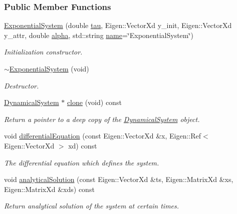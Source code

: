 \subsubsection*{Public Member Functions}
\begin{DoxyCompactItemize}
\item 
\hyperlink{classDmpBbo_1_1ExponentialSystem_a8d0556627bb524b03accc5e60dfc7e1a}{Exponential\+System} (double \hyperlink{group__DynamicalSystems_ga50eec7ad4c9664b5809ace45b22200d5}{tau}, Eigen\+::\+Vector\+Xd y\+\_\+init, Eigen\+::\+Vector\+Xd y\+\_\+attr, double \hyperlink{classDmpBbo_1_1ExponentialSystem_aee36d92680cc62cfd30ad121aa8bb47e}{alpha}, std\+::string \hyperlink{group__DynamicalSystems_gacd23346c798f78014a4f82c853e83c88}{name}=\char`\"{}Exponential\+System\char`\"{})
\begin{DoxyCompactList}\small\item\em Initialization constructor. \end{DoxyCompactList}\item 
\hyperlink{classDmpBbo_1_1ExponentialSystem_ae3aeffaf5234dfecbc5286a37bc82664}{$\sim$\+Exponential\+System} (void)
\begin{DoxyCompactList}\small\item\em Destructor. \end{DoxyCompactList}\item 
\hyperlink{classDmpBbo_1_1DynamicalSystem}{Dynamical\+System} $\ast$ \hyperlink{classDmpBbo_1_1ExponentialSystem_a16b3e8da712b58f8295cbb7951bebf68}{clone} (void) const 
\begin{DoxyCompactList}\small\item\em Return a pointer to a deep copy of the \hyperlink{classDmpBbo_1_1DynamicalSystem}{Dynamical\+System} object. \end{DoxyCompactList}\item 
void \hyperlink{classDmpBbo_1_1ExponentialSystem_ab564468764e7e4dc7c11e2a786e22c19}{differential\+Equation} (const Eigen\+::\+Vector\+Xd \&x, Eigen\+::\+Ref$<$ Eigen\+::\+Vector\+Xd $>$ xd) const 
\begin{DoxyCompactList}\small\item\em The differential equation which defines the system. \end{DoxyCompactList}\item 
void \hyperlink{classDmpBbo_1_1ExponentialSystem_ab6600b58b35bc9e66673d16f68e2e919}{analytical\+Solution} (const Eigen\+::\+Vector\+Xd \&ts, Eigen\+::\+Matrix\+Xd \&xs, Eigen\+::\+Matrix\+Xd \&xds) const 
\begin{DoxyCompactList}\small\item\em Return analytical solution of the system at certain times. \end{DoxyCompactList}\item 

\end{DoxyCompactItemize}
